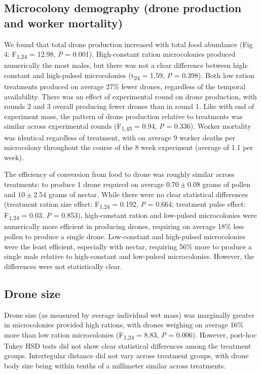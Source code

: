 \documentclass[11pt,]{article}
\begin{document}
\hypertarget{microcolony-demography-drone-production-and-worker-mortality}{%
\subsection{Microcolony demography (drone production and worker
mortality)}\label{microcolony-demography-drone-production-and-worker-mortality}}

We found that total drone production increased with total food abundance
(Fig 4: F\textsubscript{1,24} = 12.98, \emph{P} = 0.001). High-constant
ration microcolonies produced numerically the most males, but there was
not a clear difference between high-constant and high-pulsed
microcolonies (t\textsubscript{24} = 1.59, \emph{P} = 0.398). Both low
ration treatments produced on average 27\% fewer drones, regardless of
the temporal availability. There was an effect of experimental round on
drone production, with rounds 2 and 3 overall producing fewer drones
than in round 1. Like with end of experiment mass, the pattern of drone
production relative to treatments was similar across experimental rounds
(F\textsubscript{1,45} = 0.94, \emph{P} = 0.336). Worker mortality was
identical regardless of treatment, with on average 9 worker deaths per
microcolony throughout the course of the 8 week experiment (average of
1.1 per week).

The efficiency of conversion from food to drone was roughly similar
across treatments: to produce 1 drone required on average
\(0.70 \pm 0.08\) grams of pollen and \(10 \pm 2.54\) grams of nectar.
While there were no clear statistical differences (treatment ration size
effect: F\textsubscript{1,24} = 0.192, \emph{P} = 0.664; treatment pulse
effect: F\textsubscript{1,24} = 0.03, \emph{P} = 0.853), high-constant
ration and low-pulsed microcolonies were numerically more efficient in
producing drones, requiring on average 18\% less pollen to produce a
single drone. Low-constant and high-pulsed microcolonies were the least
efficient, especially with nectar, requiring 56\% more to produce a
single male relative to high-constant and low-pulsed microcolonies.
However, the differences were not statistically clear.

\hypertarget{drone-size}{%
\subsection{Drone size}\label{drone-size}}

Drone size (as measured by average individual wet mass) was marginally
greater in microcolonies provided high rations, with drones weighing on
average 16\% more than low ration microcolonies (F\textsubscript{1,24} =
8.83, \emph{P} = 0.006). However, post-hoc Tukey HSD tests did not show
clear statistical differences among the treatment groups. Intertegular
distance did not vary across treatment groups, with drone body size
being within tenths of a millimeter similar across treatments.
\end{document}

